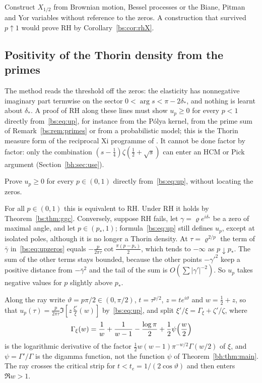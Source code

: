 \begin{question}\label{bs:q:five}
Construct $X_{1/2}$ from Brownian motion, Bessel processes or the Biane, Pitman and Yor variables \cite{BPY01} without reference to the zeros. A construction that survived $p\uparrow1$ would prove RH by Corollary~\ref{bs:cor:rhX}.
\end{question}

\subsection{Positivity of the Thorin density from the primes}\label{bs:sec:open}

\label{bs:sec:limits}The method reads the threshold off the zeros: the elasticity has nonnegative imaginary part termwise on the sector $0<\arg s<\pi-2\delta_*$, and nothing is learnt about $\delta_*$. A proof of RH along these lines must show $u_p\ge0$ for every $p<1$ directly from~\eqref{bs:eq:up}, for instance from the P\'olya kernel, from the prime sum of Remark~\ref{bs:rem:primes} or from a probabilistic model; this is the Thorin measure form of the reciprocal Xi programme of \cite{P17}. It cannot be done factor by factor: only the combination $(s-\frac14)\zeta(\frac12+\sqrt s)$ can enter an HCM or Pick argument (Section~\ref{bh:sec:use}).

\begin{question}\label{bs:q:one}
Prove $u_p\ge0$ for every $p\in(0,1)$ directly from~\eqref{bs:eq:up}, without locating the zeros.
\end{question}

For all $p\in(0,1)$ this is equivalent to RH. Under RH it holds by Theorem~\ref{bs:thm:ggc}. Conversely, suppose RH fails, let $\gamma=\varrho e^{i\delta_*}$ be a zero of maximal angle, and let $p\in(p_*,1)$; formula~\eqref{bs:eq:up} still defines $u_p$, except at isolated poles, although it is no longer a Thorin density. At $\tau=\varrho^{2/p}$ the term of $\bar\gamma$ in~\eqref{bs:eq:upzeros} equals $-\frac{p}{2\pi\tau}\cot\frac{\pi(p-p_*)}2$, which tends to $-\infty$ as $p\downarrow p_*$. The sum of the other terms stays bounded, because the other points $-\gamma'^2$ keep a positive distance from $-\bar\gamma^2$ and the tail of the sum is $O(\sum|\gamma'|^{-2})$. So $u_p$ takes negative values for $p$ slightly above $p_*$.

Along the ray write $\vartheta=p\pi/2\in(0,\pi/2)$, $t=\tau^{p/2}$, $z=te^{i\vartheta}$ and $w=\frac12+z$, so that $u_p(\tau)=\frac{p}{2\pi\tau}\Im[z\,\frac{\xi'}{\xi}(w)]$ by~\eqref{bs:eq:up}, and split $\xi'/\xi=\Gamma_\xi+\zeta'/\zeta$, where
\[
\Gamma_\xi(w)=\frac1w+\frac1{w-1}-\frac{\log\pi}2+\frac12\psi\Bigl(\frac w2\Bigr)
\]
is the logarithmic derivative of the factor $\frac12w(w-1)\pi^{-w/2}\Gamma(w/2)$ of $\xi$, and $\psi=\Gamma'/\Gamma$ is the digamma function, not the function $\psi$ of Theorem~\ref{bh:thm:main}. The ray crosses the critical strip for $t<t_e=1/(2\cos\vartheta)$ and then enters $\Re w>1$.

